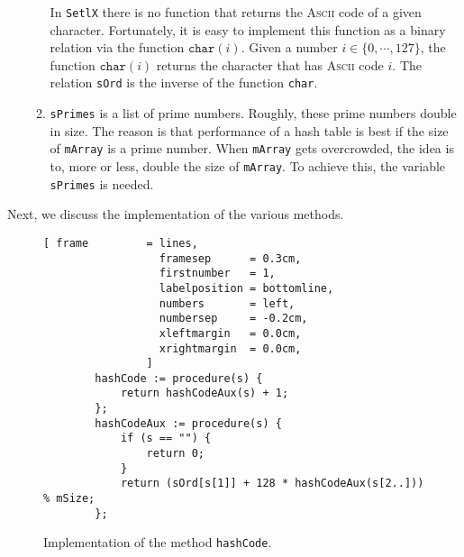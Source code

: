 \begin{enumerate}
\begin{enumerate}
        In \texttt{SetlX} there is no function that returns the \textsc{Ascii} code of a given character.
        Fortunately, it is easy to implement this function as a binary relation via the function
        $\mathtt{char}(i)$.  Given a number $i \in \{0,\cdots,127\}$, the function $\mathtt{char}(i)$
        returns the character that has \textsc{Ascii} code $i$.  The relation \texttt{sOrd} is the inverse
        of the function \texttt{char}.
  \item \texttt{sPrimes} is a list of prime numbers.  Roughly, these prime numbers double in size.
        The reason is that performance of a hash table is best if the size of \texttt{mArray} is a
        prime number.  When \texttt{mArray} gets overcrowded, the idea is to, more or less, double
        the size of \texttt{mArray}.  To achieve this, the variable \texttt{sPrimes} is needed.
  \end{enumerate}
\end{enumerate}
Next, we discuss the implementation of the various methods.

\begin{figure}[!ht]
\centering
\begin{Verbatim}[ frame         = lines, 
                  framesep      = 0.3cm, 
                  firstnumber   = 1,
                  labelposition = bottomline,
                  numbers       = left,
                  numbersep     = -0.2cm,
                  xleftmargin   = 0.0cm,
                  xrightmargin  = 0.0cm,
                ]
        hashCode := procedure(s) {
            return hashCodeAux(s) + 1;
        };
        hashCodeAux := procedure(s) {
            if (s == "") {
                return 0;
            }
            return (sOrd[s[1]] + 128 * hashCodeAux(s[2..])) % mSize;
        };
\end{Verbatim}
\vspace*{-0.3cm}
\caption{Implementation of the method \texttt{hashCode}.}
\label{fig:hashTable.stlx-hashCode}
\end{figure}

